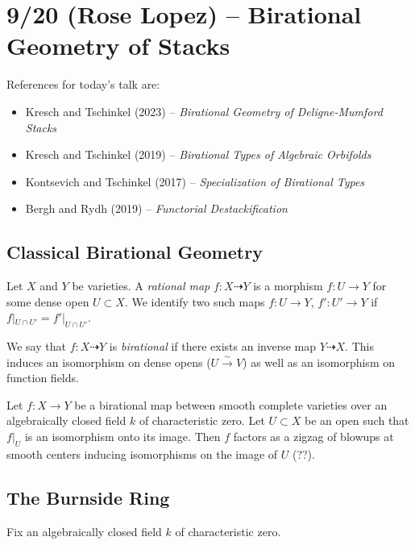 \documentclass{amsart}
\begin{document}
\section{9/20 (Rose Lopez) -- Birational Geometry of Stacks}

References for today's talk are:
\begin{itemize}
	\item Kresch and Tschinkel (2023) -- \textit{Birational Geometry of Deligne-Mumford Stacks}
	\item Kresch and Tschinkel (2019) -- \textit{Birational Types of Algebraic Orbifolds}
	\item Kontsevich and Tschinkel (2017) -- \textit{Specialization of Birational Types}
	\item Bergh and Rydh (2019) -- \textit{Functorial Destackification}
\end{itemize}

\subsection{Classical Birational Geometry}

\begin{dfn}
	Let $X$ and $Y$ be varieties.
	A \emph{rational map} $f: X \dashrightarrow Y$ is a morphism $f: U \to Y$ for some dense open $U \subset X$.
	We identify two such maps $f: U \to Y$, $f': U' \to Y$ if $f|_{U \cap U'} = f'|_{U \cap U'}$.

	We say that $f: X \dashrightarrow Y$ is \emph{birational} if there exists an inverse map $Y \dashrightarrow X$.
	This induces an isomorphism on dense opens ($U \xrightarrow{\sim} V$) as well as an isomorphism on function fields.
\end{dfn}

\begin{thm}
	Let $f: X \to Y$ be a birational map between smooth complete varieties over an algebraically closed field $k$ of characteristic zero.
	Let $U \subset X$ be an open such that $f|_U$ is an isomorphism onto its image.
	Then $f$ factors as a zigzag of blowups at smooth centers inducing isomorphisms on the image of $U$ (??).
\end{thm}

\subsection{The Burnside Ring}

Fix an algebraically closed field $k$ of characteristic zero.
\end{document}
